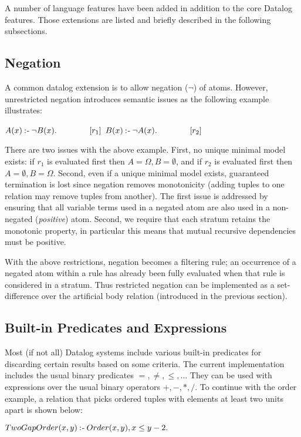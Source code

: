 A number of language features have been added in addition to the core Datalog features. Those extensions are listed and briefly described in the following subsections.
\vspace*{-5 pt}
\subsection{Negation}
A common datalog extension is to allow negation ($\neg$) of atoms. However, unrestricted negation introduces semantic issues as the following example illustrates:

\NL
{\centering
	$A(x) \mathbin{:\hspace{-0.5ex}\textsf{-}} \neg B(x).\qquad\qquad[r_1]$ \NL
	$B(x) \mathbin{:\hspace{-0.5ex}\textsf{-}} \neg A(x).\qquad\qquad[r_2]$\par
}

\NL
There are two issues with the above example. First, no unique minimal model exists: if $r_1$ is evaluated first then $A = \Omega, B = \emptyset$, and if $r_2$ is evaluated first then $A = \emptyset, B = \Omega$. Second, even if a unique minimal model exists, guaranteed termination is lost since negation removes monotonicity (adding tuples to one relation may remove tuples from another). The first issue is addressed by ensuring that all variable terms used in a negated atom are also used in a non-negated (\textit{positive}) atom. Second, we require that each stratum retains the monotonic property, in particular this means that mutual recursive dependencies must be positive.

With the above restrictions, negation becomes a filtering rule; an occurrence of a negated atom within a rule has already been fully evaluated when that rule is considered in a stratum. Thus restricted negation can be implemented as a set-difference over the artificial body relation (introduced in the previous section).

\subsection{Built-in Predicates and Expressions}
Most (if not all) Datalog systems include various built-in predicates for discarding certain results based on some criteria. The current implementation includes the usual binary predicates $=, \neq, \leq, \ldots$ They can be used with expressions over the usual binary operators $+,-,*,/$. To continue with the order example, a relation that picks ordered tuples with elements at least two units apart is shown below:

\NL
{\centering
	$TwoGapOrder(x, y) \mathbin{:\hspace{-0.5ex}\textsf{-}} Order(x, y), x \leq y - 2.$ \NL
}

